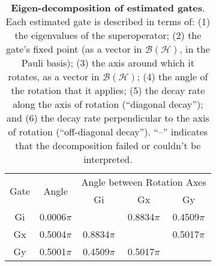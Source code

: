 {\begin{table}[h]
\begin{center}
\vspace{2em}
\begin{tabular}[l]{|c|c|c|c|c|}
\hline
\multirow{2}{*}{Gate} & \multirow{2}{*}{Angle} & \multicolumn{3}{c|}{Angle between Rotation Axes} \\ \cline{3-5}
 & & Gi & Gx & Gy \\ \hline
Gi & 0.0006$\pi$ &  & 0.8834$\pi$ & 0.4509$\pi$ \\ \hline
Gx & 0.5004$\pi$ & 0.8834$\pi$ &  & 0.5017$\pi$ \\ \hline
Gy & 0.5001$\pi$ & 0.4509$\pi$ & 0.5017$\pi$ &  \\ \hline
\end{tabular}

\caption{\textbf{Eigen-decomposition of estimated gates}.  Each estimated gate is described in terms of: (1) the eigenvalues of the superoperator; (2) the gate's fixed point (as a vector in $\mathcal{B}(\mathcal{H})$, in the Pauli basis); (3)  the axis around which it rotates, as a vector in $\mathcal{B}(\mathcal{H})$; (4) the angle of the rotation that it applies; (5) the decay rate along the axis of rotation (``diagonal decay''); and (6) the decay rate perpendicular to the axis of rotation (``off-diagonal decay'').  ``--'' indicates that the decomposition failed or couldn't be interpreted. \label{bestCPTPGatesetDecompTable}}
\end{center}
\end{table}


}
